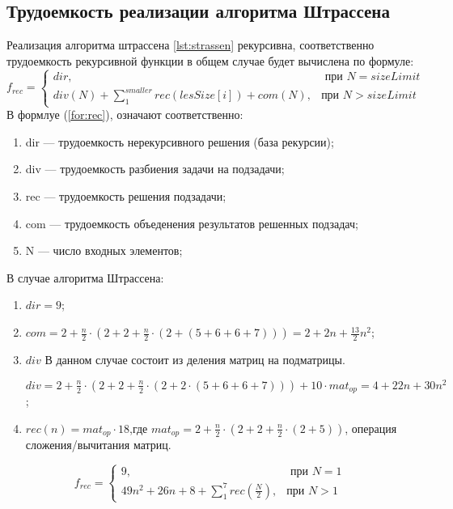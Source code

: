 \subsection{Трудоемкость реализации алгоритма Штрассена}
Реализация алгоритма штрассена \ref{lst:strassen} рекурсивна, соответственно трудоемкость рекурсивной функции в общем случае будет вычислена по формуле:
\begin{equation}
	\label{for:rec}
	f_{rec} =
	\begin{cases}
		dir, & \text{ при $N = sizeLimit$}\\
		div(N) +\sum_{1}^{smaller}{rec(lesSize[i])} + com(N), & \text{при $N> sizeLimit$}
	\end{cases}
\end{equation}
В формлуе (\ref{for:rec}), означают соответственно:
\begin{enumerate}
	\item dir --- трудоемкость нерекурсивного решения (база рекурсии);
	\item div --- трудоемкость разбиения задачи на подзадачи;
	\item rec --- трудоемкость решения подзадачи;
	\item com --- трудоемкость объеденения результатов решенных подзадач;
	\item N --- число входных элементов;
\end{enumerate}


В случае алгоритма Штрассена:
\begin{enumerate}
	\item $dir  = 9$;
	\item $com =  2 + \frac{n}{2} \cdot (2 + 2 + \frac{n}{2} \cdot (2 +  (5 + 6 + 6 + 7))) = 2 +2n + \frac{13}{2}n^2$;
	\item $div$ В данном случае состоит из деления матриц на подматрицы.
	
	$div = 2 + \frac{n}{2} \cdot (2 + 2 + \frac{n}{2} \cdot (2 + 2 \cdot (5 + 6 + 6 + 7))) +10 \cdot mat_{op} = 4 + 22n + 30n^{2}$;

	\item $rec(n) = mat_{op} \cdot 18$,где $mat_{op} = 2 + \frac{n}{2} \cdot (2 + 2 + \frac{n}{2} \cdot (2 +5))$, операция сложения/вычитания матриц.
\end{enumerate}




\begin{equation}
	\label{for:rec_strassen_fixed}
	f_{rec} =
	\begin{cases}
		9, & \text{ при $N = 1$}\\
		49n^2+26n+8 + \sum_{1}^{7}{rec(\frac{N}{2})}, & \text{при $N> 1$}
	\end{cases}
\end{equation}

